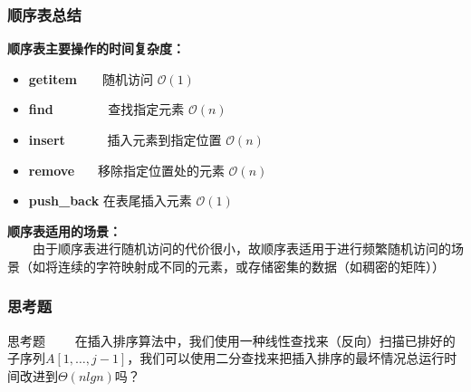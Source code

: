 \documentclass{beamer}
\begin{document}
	\begin{frame}\frametitle{顺序表总结}
		\textbf{顺序表主要操作的时间复杂度：}
		\begin{itemize}
			\item \textbf{getitem}\ \ \ \  随机访问 $\mathcal{O}(1)$
			\item \textbf{find} \ \ \ \ \ \ \ \ 查找指定元素 $\mathcal{O}(n)$
			\item \textbf{insert} \ \ \ \ \ \ 插入元素到指定位置 $\mathcal{O}(n)$
			\item \textbf{remove} \ \ \ 移除指定位置处的元素 $\mathcal{O}(n)$
			\item \textbf{push\_back} 在表尾插入元素 $\mathcal{O}(1)$
		\end{itemize} 
		\textbf{顺序表适用的场景：} \\
		\ \ \ \ 由于顺序表进行随机访问的代价很小，故顺序表适用于进行频繁随机访问的场景（如将连续的字符映射成不同的元素，或存储密集的数据（如稠密的矩阵））
	\end{frame}
	\begin{frame}\frametitle{思考题}
		\begin{block}{思考题}
			\ \ \ \ 在插入排序算法中，我们使用一种线性查找来（反向）扫描已排好的子序列$A[1,\dots, j-1]$，我们可以使用二分查找来把插入排序的最坏情况总运行时间改进到$\Theta(nlgn)$吗？
		\end{block}
	\end{frame}
\end{document}
